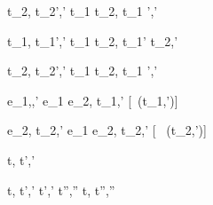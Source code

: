   {t_2,\sigma {} {t_2}',{\sigma}'}
  {t_1 \And t_2,\sigma {} t_1 ',{\sigma}'}


  {t_1,\sigma {} {t_1}',{\sigma}'}
  {t_1 \Or t_2,\sigma {} {t_1}' \Or t_2,{\sigma}'}

  {t_2,\sigma {} {t_2}',{\sigma}' }
  {t_1 \Or t_2,\sigma {} t_1 ',{\sigma}'}


  {e_1,\sigma {},{\sigma}'}
  {e_1 \Xor e_2,\sigma \xrightarrow[]{\Left} {t_1},{\sigma}'}
  [\neg\Failing\ ({t_1},{\sigma}')]

  {e_2,\sigma {\normalise} {t_2},{\sigma}'}
  {e_1 \Xor e_2,\sigma \xrightarrow[]{\Right} {t_2},{\sigma}'}
  [ \neg\Failing\ ({t_2},{\sigma}')]




  {t,\sigma {} t',\sigma'}



  {t,\sigma {} {t}',{\sigma}' \Quad
   {t}',{\sigma}' {\normalise} {t}'',{\sigma}''}
  {t,\sigma {} {t}'',{\sigma}''}
